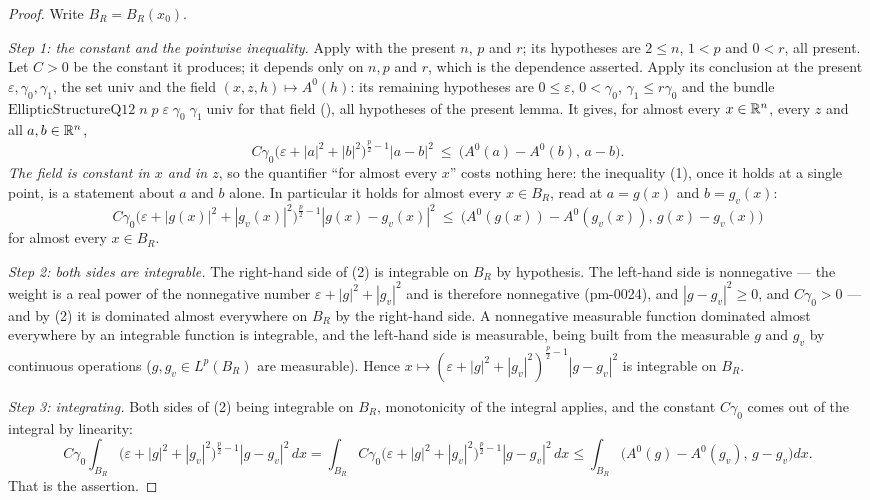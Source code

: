 \begin{proof}
Write $B_R=B_R(x_0)$.

\emph{Step 1: the constant and the pointwise inequality.}  Apply
 with the present $n$, $p$ and $r$; its
hypotheses are $2\le n$, $1<p$ and $0<r$, all present.  Let $C>0$ be the
constant it produces; it depends only on $n,p$ and $r$, which is the dependence
asserted.  Apply its conclusion at the present $\varepsilon,\gamma_0,\gamma_1$,
the set $\mathrm{univ}$ and the field $(x,z,h)\mapsto A^0(h)$: its remaining
hypotheses are $0\le\varepsilon$, $0<\gamma_0$, $\gamma_1\le r\gamma_0$ and the
bundle $\mathrm{EllipticStructureQ12}\;n\;p\;\varepsilon\;\gamma_0\;\gamma_1\;
\mathrm{univ}$ for that field (), all hypotheses
of the present lemma.  It gives, for almost every $x\in\mathbb{R}^n$, every $z$ and all
$a,b\in\mathbb{R}^n$,
\[
C\gamma_0\bigl(\varepsilon+|a|^2+|b|^2\bigr)^{\frac p2-1}|a-b|^2
\ \le\ \bigl(A^0(a)-A^0(b),\,a-b\bigr).
\tag{1}
\]
\emph{The field is constant in $x$ and in $z$}, so the quantifier ``for almost
every $x$'' costs nothing here: the inequality (1), once it holds at a single
point, is a statement about $a$ and $b$ alone.  In particular it holds for
almost every $x\in B_R$, read at $a=g(x)$ and $b=g_v(x)$:
\[
C\gamma_0\bigl(\varepsilon+|g(x)|^2+|g_v(x)|^2\bigr)^{\frac p2-1}|g(x)-g_v(x)|^2
\ \le\ \bigl(A^0(g(x))-A^0(g_v(x)),\,g(x)-g_v(x)\bigr)
\tag{2}
\]
for almost every $x\in B_R$.

\emph{Step 2: both sides are integrable.}  The right-hand side of (2) is
integrable on $B_R$ by hypothesis.  The left-hand side is nonnegative --- the
weight is a real power of the nonnegative number $\varepsilon+|g|^2+|g_v|^2$ and
is therefore nonnegative (pm-0024), and $|g-g_v|^2\ge0$, and $C\gamma_0>0$ ---
and by (2) it is dominated almost everywhere on $B_R$ by the right-hand side.
A nonnegative measurable function dominated almost everywhere by an integrable
function is integrable, and the left-hand side is measurable, being built from
the measurable $g$ and $g_v$ by continuous operations ($g,g_v\in L^p(B_R)$ are
measurable).  Hence
$x\mapsto(\varepsilon+|g|^2+|g_v|^2)^{\frac p2-1}|g-g_v|^2$ is integrable on
$B_R$.

\emph{Step 3: integrating.}  Both sides of (2) being integrable on $B_R$,
monotonicity of the integral applies, and the constant $C\gamma_0$ comes out of
the integral by linearity:
\[
C\gamma_0\int_{B_R}
\bigl(\varepsilon+|g|^2+|g_v|^2\bigr)^{\frac p2-1}|g-g_v|^2\,dx
=\int_{B_R}C\gamma_0\bigl(\varepsilon+|g|^2+|g_v|^2\bigr)^{\frac p2-1}
|g-g_v|^2\,dx
\le\int_{B_R}\bigl(A^0(g)-A^0(g_v),\,g-g_v\bigr)dx .
\]
That is the assertion.


\end{proof}

